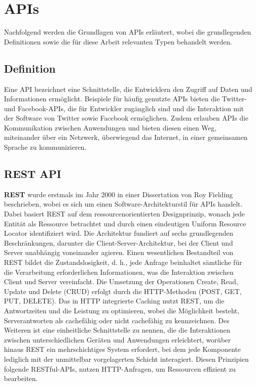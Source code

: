 
\section{APIs} %
\label{sec:apigrundlagen}
Nachfolgend werden die Grundlagen von APIs erläutert, wobei die grundlegenden Definitionen sowie die für diese Arbeit relevanten Typen behandelt werden.
\subsection{Definition} %
\label{sec:grundlegendedefinitionvonapi}
Eine API bezeichnet eine Schnittstelle, die Entwicklern den Zugriff auf Daten und Informationen ermöglicht. Beispiele für häufig genutzte APIs bieten die Twitter- und Facebook-APIs, die für Entwickler zugänglich sind und die Interaktion mit der Software von Twitter sowie Facebook ermöglichen. Zudem erlauben APIs die Kommunikation zwischen Anwendungen und bieten diesen einen Weg, miteinander über ein Netzwerk, überwiegend das Internet, in einer gemeinsamen Sprache zu kommunizieren.  \citep{apistrategyguide}
\newpage
\subsection{REST API} %
\label{sec:restapi}
 \textbf{REST} wurde erstmals im Jahr 2000 in einer Dissertation von Roy Fielding beschrieben, wobei es sich um einen Software-Architekturstil für APIs handelt. Dabei basiert REST auf dem ressourcenorientierten Designprinzip, wonach jede Entität als Ressource betrachtet und durch einen eindeutigen Uniform Resource Locator identifiziert wird. Die Architektur fundiert auf sechs grundlegenden Beschränkungen, darunter die Client-Server-Architektur, bei der Client und Server unabhängig voneinander agieren. Einen wesentlichen Bestandteil von REST bildet die Zustandslosigkeit, d. h., jede Anfrage beinhaltet sämtliche für die Verarbeitung erforderlichen Informationen, was die Interaktion zwischen Client und Server vereinfacht. Die Umsetzung der Operationen Create, Read, Update und Delete (CRUD) erfolgt durch die HTTP-Methoden (POST, GET, PUT, DELETE). Das in HTTP integrierte Caching nutzt REST, um die Antwortzeiten und die Leistung zu optimieren, wobei die Möglichkeit besteht, Serverantworten als cachefähig oder nicht cachefähig zu kennzeichnen. Des Weiteren ist eine einheitliche Schnittstelle zu nennen, die die Interaktionen zwischen unterschiedlichen Geräten und Anwendungen erleichtert, worüber hinaus REST ein mehrschichtiges System erfordert, bei dem jede Komponente lediglich mit der unmittelbar vorgelagerten Schicht interagiert. Diesen Prinzipien folgende RESTful-APIs, nutzen HTTP-Anfragen, um Ressourcen effizient zu bearbeiten.  \citep{Fielding2000}  \citep{graphqlreplacerest}

